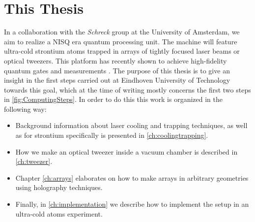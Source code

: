 \section{This Thesis}

In a collaboration with the \textit{Schreck} group at the University of Amsterdam, we aim to realize a NISQ era quantum processing unit. The machine will feature ultra-cold strontium atoms trapped in arrays of tightly focused laser beams or optical tweezers. This platform has recently shown to achieve high-fidelity quantum gates and measurements \cite{Madjarov2020}. The purpose of this thesis is to give an insight in the first steps carried out at Eindhoven University of Technology towards this goal, which at the time of writing mostly concerns the first two steps in \cref{fig:ComputingSteps}. In order to do this this work is organized in the following way:

\begin{itemize}
	\setlength\itemsep{0em}
	\item Background information about laser cooling and trapping techniques, as well as for strontium specifically is presented in \cref{ch:coolingtrapping}. 

	\item How we make an optical tweezer inside a vacuum chamber is described in \cref{ch:tweezer}. 

	\item Chapter \ref{ch:arrays} elaborates on how to make arrays in arbitrary geometries using holography techniques.

	\item Finally, in \cref{ch:implementation} we describe how to implement the setup in an ultra-cold atoms experiment.
\end{itemize}










